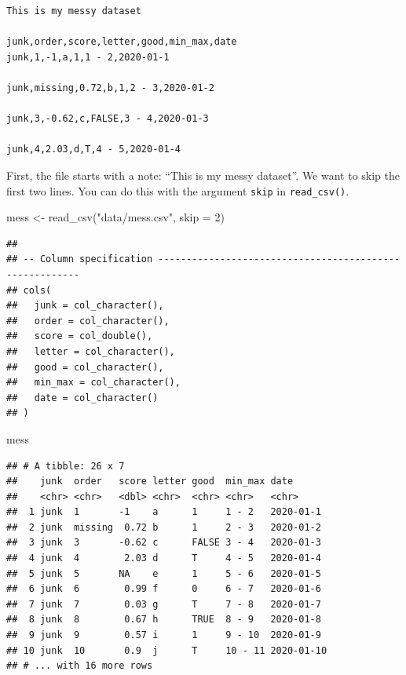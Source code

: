 \documentclass[
  oneside]{book}
\newenvironment{Shaded}{\begin{snugshade}}{\end{snugshade}}
\newcommand{\AttributeTok}[1]{\textcolor[rgb]{0.77,0.63,0.00}{#1}}
\newcommand{\DecValTok}[1]{\textcolor[rgb]{0.00,0.00,0.81}{#1}}
\newcommand{\FunctionTok}[1]{\textcolor[rgb]{0.00,0.00,0.00}{#1}}
\newcommand{\NormalTok}[1]{#1}
\newcommand{\OtherTok}[1]{\textcolor[rgb]{0.56,0.35,0.01}{#1}}
\newcommand{\StringTok}[1]{\textcolor[rgb]{0.31,0.60,0.02}{#1}}
\begin{document}
\begin{verbatim}
This is my messy dataset

junk,order,score,letter,good,min_max,date
junk,1,-1,a,1,1 - 2,2020-01-1

junk,missing,0.72,b,1,2 - 3,2020-01-2

junk,3,-0.62,c,FALSE,3 - 4,2020-01-3

junk,4,2.03,d,T,4 - 5,2020-01-4
\end{verbatim}

First, the file starts with a note: ``This is my messy dataset''. We want to skip the first two lines. You can do this with the argument \texttt{skip} in \texttt{read\_csv()}.

\begin{Shaded}
\begin{Highlighting}[]
\NormalTok{mess }\OtherTok{\textless{}{-}} \FunctionTok{read\_csv}\NormalTok{(}\StringTok{"data/mess.csv"}\NormalTok{, }\AttributeTok{skip =} \DecValTok{2}\NormalTok{)}
\end{Highlighting}
\end{Shaded}

\begin{verbatim}
## 
## -- Column specification --------------------------------------------------------
## cols(
##   junk = col_character(),
##   order = col_character(),
##   score = col_double(),
##   letter = col_character(),
##   good = col_character(),
##   min_max = col_character(),
##   date = col_character()
## )
\end{verbatim}

\begin{Shaded}
\begin{Highlighting}[]
\NormalTok{mess}
\end{Highlighting}
\end{Shaded}

\begin{verbatim}
## # A tibble: 26 x 7
##    junk  order   score letter good  min_max date      
##    <chr> <chr>   <dbl> <chr>  <chr> <chr>   <chr>     
##  1 junk  1       -1    a      1     1 - 2   2020-01-1 
##  2 junk  missing  0.72 b      1     2 - 3   2020-01-2 
##  3 junk  3       -0.62 c      FALSE 3 - 4   2020-01-3 
##  4 junk  4        2.03 d      T     4 - 5   2020-01-4 
##  5 junk  5       NA    e      1     5 - 6   2020-01-5 
##  6 junk  6        0.99 f      0     6 - 7   2020-01-6 
##  7 junk  7        0.03 g      T     7 - 8   2020-01-7 
##  8 junk  8        0.67 h      TRUE  8 - 9   2020-01-8 
##  9 junk  9        0.57 i      1     9 - 10  2020-01-9 
## 10 junk  10       0.9  j      T     10 - 11 2020-01-10
## # ... with 16 more rows
\end{verbatim}
\end{document}
